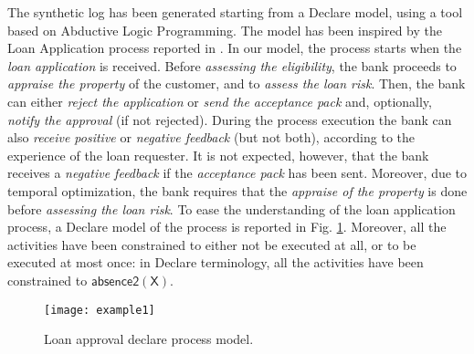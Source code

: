 The synthetic log has been generated starting from a Declare model, using a tool \cite{2020-Loreti} based on Abductive Logic Programming. The model has been inspired by the Loan Application process reported in \cite{DBLP:books/sp/DumasRMR18}. In our model, the process starts when the \emph{loan application} is received. Before \emph{assessing the eligibility}, the bank proceeds to \emph{appraise the property} of the customer, and to \emph{assess the loan risk}. Then, the bank can either \emph{reject the application} or \emph{send the acceptance pack} and, optionally, \emph{notify the approval} (if not rejected). During the process execution the bank can also \emph{receive positive} or \emph{negative feedback} (but not both), according to the experience of the loan requester. It is not expected, however, that the bank receives a \emph{negative feedback} if the \emph{acceptance pack} has been sent. Moreover, due to temporal optimization, the bank requires that the \emph{appraise of the property} is done before \emph{assessing the loan risk}.
To ease the understanding of the loan application process, a Declare model of the process is reported in Fig. \ref{fig:ex}. Moreover, all the activities have been constrained to either not be executed at all, or to be executed at most once: in Declare terminology, all the activities have been constrained to $\mathsf{absence2(X)}$.

\begin{figure}[t]
\centering
\texttt{[image: example1]}
\caption{Loan approval declare process model.}
\label{fig:ex}
\end{figure}

